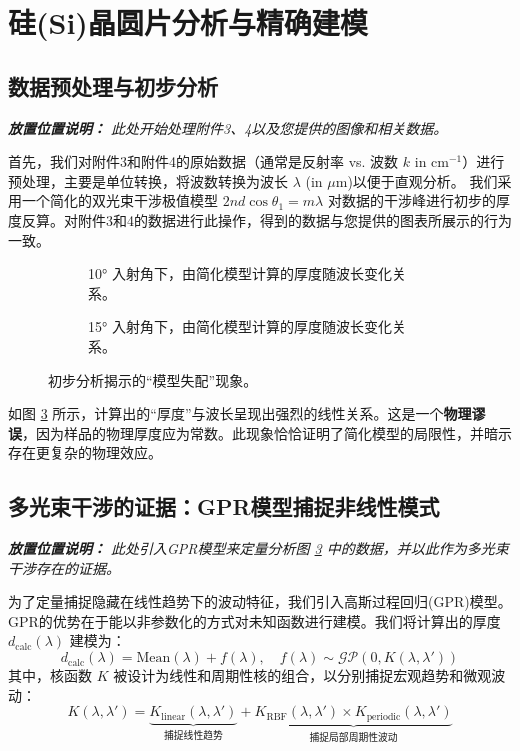 \documentclass[UTF8, 12pt]{ctexart}
\begin{document}
\section{硅(Si)晶圆片分析与精确建模}

\subsection{数据预处理与初步分析}
\textit{\textbf{放置位置说明：} 此处开始处理附件3、4以及您提供的图像和相关数据。}

首先，我们对附件3和附件4的原始数据（通常是反射率 vs. 波数 $k$ in cm$^{-1}$）进行预处理，主要是单位转换，将波数转换为波长 $\lambda$ (in $\mu$m)以便于直观分析。
我们采用一个简化的双光束干涉极值模型 $2nd\cos\theta_1 = m\lambda$ 对数据的干涉峰进行初步的厚度反算。对附件3和4的数据进行此操作，得到的数据与您提供的图表所展示的行为一致。

\begin{figure}[H]
    \centering
    \begin{subfigure}[b]{0.85\textwidth}
        \centering
        \caption{10° 入射角下，由简化模型计算的厚度随波长变化关系。}
        \label{fig:si_10deg}
    \end{subfigure}
    \vfill
    \begin{subfigure}[b]{0.85\textwidth}
        \centering
        \caption{15° 入射角下，由简化模型计算的厚度随波长变化关系。}
        \label{fig:si_15deg}
    \end{subfigure}
    \caption{初步分析揭示的“模型失配”现象。}
    \label{fig:si_preliminary}
\end{figure}

如图 \ref{fig:si_preliminary} 所示，计算出的“厚度”与波长呈现出强烈的线性关系。这是一个\textbf{物理谬误}，因为样品的物理厚度应为常数。此现象恰恰证明了简化模型的局限性，并暗示存在更复杂的物理效应。

\subsection{多光束干涉的证据：GPR模型捕捉非线性模式}
\textit{\textbf{放置位置说明：} 此处引入GPR模型来定量分析图 \ref{fig:si_preliminary} 中的数据，并以此作为多光束干涉存在的证据。}

为了定量捕捉隐藏在线性趋势下的波动特征，我们引入高斯过程回归(GPR)模型。GPR的优势在于能以非参数化的方式对未知函数进行建模。我们将计算出的厚度 $d_{\text{calc}}(\lambda)$ 建模为：
\begin{equation}
    d_{\text{calc}}(\lambda) = \text{Mean}(\lambda) + f(\lambda), \quad f(\lambda) \sim \mathcal{GP}(0, K(\lambda, \lambda'))
\end{equation}
其中，核函数 $K$ 被设计为线性和周期性核的组合，以分别捕捉宏观趋势和微观波动：
\begin{equation}
    K(\lambda, \lambda') = \underbrace{K_{\text{linear}}(\lambda, \lambda')}_{\text{捕捉线性趋势}} + \underbrace{K_{\text{RBF}}(\lambda, \lambda') \times K_{\text{periodic}}(\lambda, \lambda')}_{\text{捕捉局部周期性波动}}
\end{equation}
\end{document}
